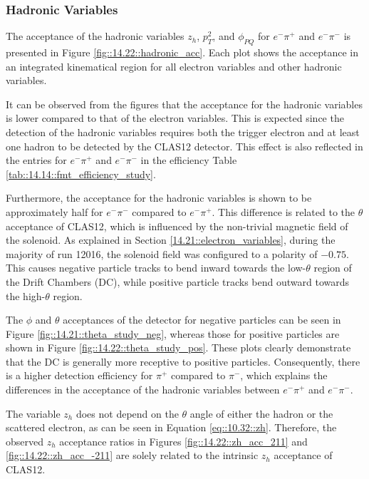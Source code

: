 \subsubsection{Hadronic Variables}
\label{14.22::hadronic_variables}
    The acceptance of the hadronic variables $z_h$, $p_T^2$, and $\phi_{PQ}$ for $e^-\pi^+$ and $e^-\pi^-$ is presented in Figure \ref{fig::14.22::hadronic_acc}.
    Each plot shows the acceptance in an integrated kinematical region for all electron variables and other hadronic variables.

    It can be observed from the figures that the acceptance for the hadronic variables is lower compared to that of the electron variables.
    This is expected since the detection of the hadronic variables requires both the trigger electron and at least one hadron to be detected by the CLAS12 detector.
    This effect is also reflected in the entries for $e^-\pi^+$ and $e^-\pi^-$ in the efficiency Table \ref{tab::14.14::fmt_efficiency_study}.

    Furthermore, the acceptance for the hadronic variables is shown to be approximately half for $e^-\pi^-$ compared to $e^-\pi^+$.
    This difference is related to the $\theta$ acceptance of CLAS12, which is influenced by the non-trivial magnetic field of the solenoid.
    As explained in Section \ref{14.21::electron_variables}, during the majority of run 12016, the solenoid field was configured to a polarity of $-0.75$.
    This causes negative particle tracks to bend inward towards the low-$\theta$ region of the Drift Chambers (DC), while positive particle tracks bend outward towards the high-$\theta$ region.

    The $\phi$ and $\theta$ acceptances of the detector for negative particles can be seen in Figure \ref{fig::14.21::theta_study_neg}, whereas those for positive particles are shown in Figure \ref{fig::14.22::theta_study_pos}.
    These plots clearly demonstrate that the DC is generally more receptive to positive particles.
    Consequently, there is a higher detection efficiency for $\pi^+$ compared to $\pi^-$, which explains the differences in the acceptance of the hadronic variables between $e^-\pi^+$ and $e^-\pi^-$.

    The variable $z_h$ does not depend on the $\theta$ angle of either the hadron or the scattered electron, as can be seen in Equation \eqref{eq::10.32::zh}.
    Therefore, the observed $z_h$ acceptance ratios in Figures \ref{fig::14.22::zh_acc_211} and \ref{fig::14.22::zh_acc_-211} are solely related to the intrinsic $z_h$ acceptance of CLAS12.

